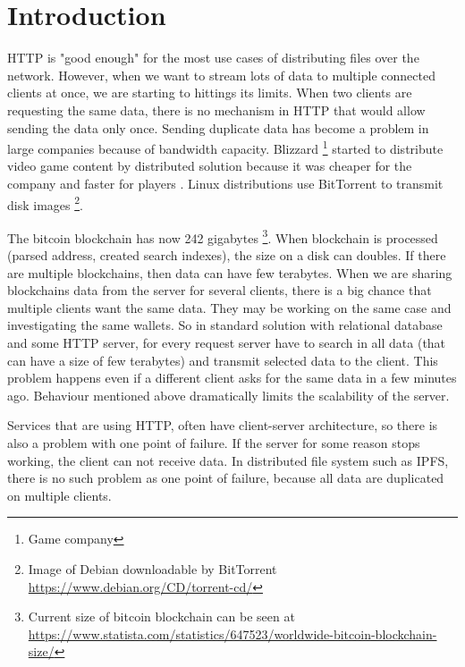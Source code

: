 \chapter{Introduction}


HTTP is "good enough" for the most use cases of distributing files over the network. However, when we want to stream lots of data to multiple connected clients at once, we are starting to hittings its limits. When two clients are requesting the same data, there is no mechanism in HTTP that would allow sending the data only once. Sending duplicate data has become a problem in large companies because of bandwidth capacity. Blizzard \footnote{Game company} started to distribute video game content by distributed solution because it was cheaper for the company and faster for players \cite{BigDataInVideoGames}. Linux distributions use BitTorrent to transmit disk images \footnote{Image of Debian downloadable by BitTorrent \url{https://www.debian.org/CD/torrent-cd/}}.

The bitcoin blockchain has now 242 gigabytes \footnote{Current size of bitcoin blockchain can be seen at \url{https://www.statista.com/statistics/647523/worldwide-bitcoin-blockchain-size/}}. When blockchain is processed (parsed address, created search indexes), the size on a disk can doubles. If there are multiple blockchains, then data can have few terabytes. When we are sharing blockchains data from the server for several clients, there is a big chance that multiple clients want the same data. They may be working on the same case and investigating the same wallets.  So in standard solution with relational database and some HTTP server, for every request server have to search in all data (that can have a size of few terabytes) and transmit selected data to the client. This problem happens even if a different client asks for the same data in a few minutes ago. Behaviour mentioned above dramatically limits the scalability of the server.

Services that are using HTTP, often have client-server architecture, so there is also a problem with one point of failure. If the server for some reason stops working, the client can not receive data. In distributed file system such as IPFS, there is no such problem as one point of failure, because all data are duplicated on multiple clients.

